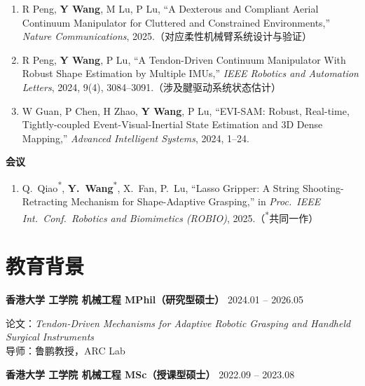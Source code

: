 \documentclass[11pt,a4paper]{article}
\newcommand{\cvdate}[1]{\hfill\textcolor{midgray}{\small #1}}
\begin{document}
\begin{enumerate}[nosep, left=1.2em, label=\textcolor{accent}{\small\arabic*}., itemsep=0.06em]
  \item \small R Peng, \textbf{Y Wang}, M Lu, P Lu, ``A Dexterous and Compliant Aerial Continuum Manipulator for Cluttered and Constrained Environments,'' \textit{Nature Communications}, 2025.（对应柔性机械臂系统设计与验证）
  \item \small R Peng, \textbf{Y Wang}, P Lu, ``A Tendon-Driven Continuum Manipulator With Robust Shape Estimation by Multiple IMUs,'' \textit{IEEE Robotics and Automation Letters}, 2024, 9(4), 3084--3091.（涉及腱驱动系统状态估计）
  \item \small W Guan, P Chen, H Zhao, \textbf{Y Wang}, P Lu, ``EVI-SAM: Robust, Real-time, Tightly-coupled Event-Visual-Inertial State Estimation and 3D Dense Mapping,'' \textit{Advanced Intelligent Systems}, 2024, 1--24.
\end{enumerate}

\vspace{0.2em}
{\sffamily\bfseries\small 会议}

\begin{enumerate}[nosep, left=1.2em, label=\textcolor{accent}{\small\arabic*}., itemsep=0.06em]
  \item \small Q.~Qiao\textsuperscript{*}, \textbf{Y.~Wang}\textsuperscript{*}, X.~Fan, P.~Lu, ``Lasso Gripper: A String Shooting-Retracting Mechanism for Shape-Adaptive Grasping,'' in \textit{Proc.\ IEEE Int.\ Conf.\ Robotics and Biomimetics (ROBIO)}, 2025.（\textsuperscript{*}共同一作）
\end{enumerate}

\section{教育背景}

{\bfseries 香港大学 \quad 工学院 \quad 机械工程 \quad MPhil（研究型硕士）} \cvdate{2024.01 -- 2026.05}

{\small 论文：\textit{Tendon-Driven Mechanisms for Adaptive Robotic Grasping and Handheld Surgical Instruments}} \\
{\small 导师：鲁鹏教授，ARC Lab}

\vspace{0.18em}
{\bfseries 香港大学 \quad 工学院 \quad 机械工程 \quad MSc（授课型硕士）} \cvdate{2022.09 -- 2023.08}
\end{document}
